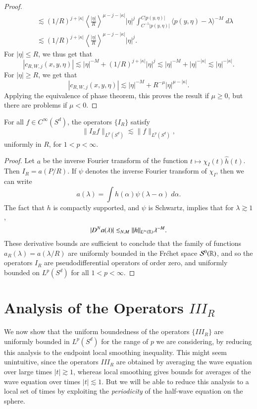 \begin{proof}
\begin{align*}
        &\quad \lesssim (1/R)^{j + |\kappa|} \left\langle \frac{|\eta|}{R} \right\rangle^{\mu - j - |\kappa|} |\eta|^j \int_{C^{-1} |p(y,\eta)|}^{C |p(y,\eta)|} \langle p(y,\eta) - \lambda \rangle^{-M}\; d\lambda\\
        &\quad \lesssim (1/R)^{j + |\kappa|} \left\langle \frac{|\eta|}{R} \right\rangle^{\mu - j - |\kappa|} |\eta|^j.
    \end{align*}
    For $|\eta| \leq R$, we thus get that
    \[ |c_{R,W,j}(x,y,\eta)| \lesssim |\eta|^{-M} + (1/R)^{j + |\kappa|} |\eta|^j \lesssim |\eta|^{-M} + |\eta|^{-|\kappa|} \lesssim |\eta|^{-|\kappa|}. \]
    For $|\eta| \geq R$, we get that
    \[ |c_{R,W,j}(x,y,\eta)| \lesssim |\eta|^{-M} + R^{- \mu} |\eta|^{\mu - |\kappa|}. \]
    Applying the equivalence of phase theorem, this proves the result if $\mu \geq 0$, but there are problems if $\mu < 0$.
\end{proof}




\begin{lemma}
    For all $f \in C^\infty(S^d)$, the operators $\{ I_R \}$ satisfy
    \[ \| I_R f \|_{L^p(S^d)} \lesssim \| f \|_{L^p(S^d)}, \] 
    uniformly in $R$, for $1 < p < \infty$.
\end{lemma}
\begin{proof}
    Let $a$ be the inverse Fourier transform of the function $t \mapsto \chi_I(t) \widehat{h}(t)$. Then $I_R = a(P/R)$. If $\psi$ denotes the inverse Fourier transform of $\chi_I$, then we can write
    \[ a(\lambda) = \int h(\alpha) \psi(\lambda - \alpha)\; d\alpha. \]
    The fact that $h$ is compactly supported, and $\psi$ is Schwartz, implies that for $\lambda \gtrsim 1$,
    \[ |D^N a(\lambda)| \lesssim_{N,M} \| h \|_{L^\infty(\operatorname{\mathbb{R}})} \lambda^{-M}. \]
    These derivative bounds are sufficient to conclude that the family of functions $a_R(\lambda) = a(\lambda/R)$ are uniformly bounded in the Fr\'{c}het space $\mathcal{S}^0(\operatorname{\mathbb{R}})$, and so the operators $I_R$ are pseudodifferential operators of order zero, and uniformly bounded on $L^p(S^d)$ for all $1 < p < \infty$.
\end{proof}

\section{Analysis of the Operators $III_R$}

We now show that the uniform boundedness of the operators $\{ III_R \}$ are uniformly bounded in $L^p(S^d)$ for the range of $p$ we are considering, by reducing this analysis to the endpoint local smoothing inequality. This might seem unintuitive, since the operators $III_R$ are obtained by averaging the wave equation over large times $|t| \gtrsim 1$, whereas local smoothing gives bounds for averages of the wave equation over times $|t| \lesssim 1$. But we will be able to reduce this analysis to a local set of times by exploiting the \emph{periodicity} of the half-wave equation on the sphere.

